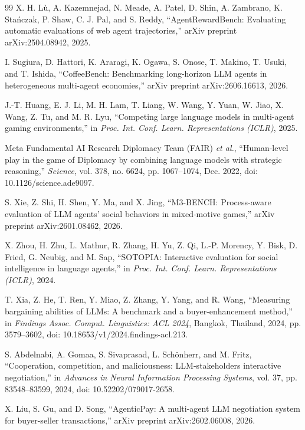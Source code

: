 \documentclass[conference]{IEEEtran}
\begin{document}
\begin{thebibliography}{99}
X. H. L\`u, A. Kazemnejad, N. Meade, A. Patel, D. Shin, A. Zambrano,
K. Sta\'nczak, P. Shaw, C. J. Pal, and S. Reddy, ``AgentRewardBench:
Evaluating automatic evaluations of web agent trajectories,'' arXiv preprint
arXiv:2504.08942, 2025.

I. Sugiura, D. Hattori, K. Araragi, K. Ogawa, S. Onose, T. Makino,
T. Usuki, and T. Ishida, ``CoffeeBench: Benchmarking long-horizon LLM agents
in heterogeneous multi-agent economies,'' arXiv preprint arXiv:2606.16613,
2026.

J.-T. Huang, E. J. Li, M. H. Lam, T. Liang, W. Wang, Y. Yuan,
W. Jiao, X. Wang, Z. Tu, and M. R. Lyu, ``Competing large language models in
multi-agent gaming environments,'' in \emph{Proc. Int. Conf. Learn.
Representations (ICLR)}, 2025.

Meta Fundamental AI Research Diplomacy Team (FAIR) \emph{et al.},
``Human-level play in the game of Diplomacy by combining language models with
strategic reasoning,'' \emph{Science}, vol. 378, no. 6624, pp. 1067--1074,
Dec. 2022, doi: 10.1126/science.ade9097.

S. Xie, Z. Shi, H. Shen, Y. Ma, and X. Jing, ``M3-BENCH:
Process-aware evaluation of LLM agents' social behaviors in mixed-motive
games,'' arXiv preprint arXiv:2601.08462, 2026.

X. Zhou, H. Zhu, L. Mathur, R. Zhang, H. Yu, Z. Qi, L.-P. Morency, Y. Bisk,
D. Fried, G. Neubig, and M. Sap, ``SOTOPIA: Interactive evaluation for social
intelligence in language agents,'' in \emph{Proc. Int. Conf. Learn.
Representations (ICLR)}, 2024.

T. Xia, Z. He, T. Ren, Y. Miao, Z. Zhang, Y. Yang, and R. Wang, ``Measuring
bargaining abilities of LLMs: A benchmark and a buyer-enhancement method,''
in \emph{Findings Assoc. Comput. Linguistics: ACL 2024}, Bangkok, Thailand,
2024, pp. 3579--3602, doi: 10.18653/v1/2024.findings-acl.213.

S. Abdelnabi, A. Gomaa, S. Sivaprasad, L. Sch\"onherr, and M. Fritz,
``Cooperation, competition, and maliciousness: LLM-stakeholders interactive
negotiation,'' in \emph{Advances in Neural Information Processing Systems},
vol. 37, pp. 83548--83599, 2024, doi: 10.52202/079017-2658.

X. Liu, S. Gu, and D. Song, ``AgenticPay: A multi-agent LLM negotiation
system for buyer-seller transactions,'' arXiv preprint arXiv:2602.06008,
2026.


\end{thebibliography}
\end{document}
